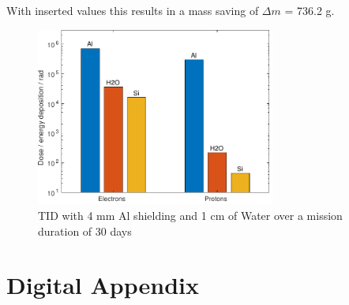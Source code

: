 With inserted values this results in a mass saving of \(\Delta m\) = 736.2 g.

\begin{figure}[htp]
	\centering
	\includegraphics[width=0.7\textwidth]{Media/J_Improvements_Ice}
	\caption{TID with 4 mm Al shielding and 1 cm of Water over a mission duration of 30 days}
	\label{fig:Radiation_Improvements_Ice}
\end{figure}

\clearpage

\setcounter{figure}{0}
\setcounter{table}{0}

\section{Digital Appendix}
\label{app:DigitalAppendix}

\cleardoublepage